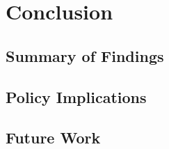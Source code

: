 
\chapter{Conclusion}
\label{chap:conclusion}


\section{Summary of Findings}
\label{sec:summary}


\section{Policy Implications}
\label{sec:policy_implications}


\section{Future Work}
\label{sec:future_work}


\endinput
